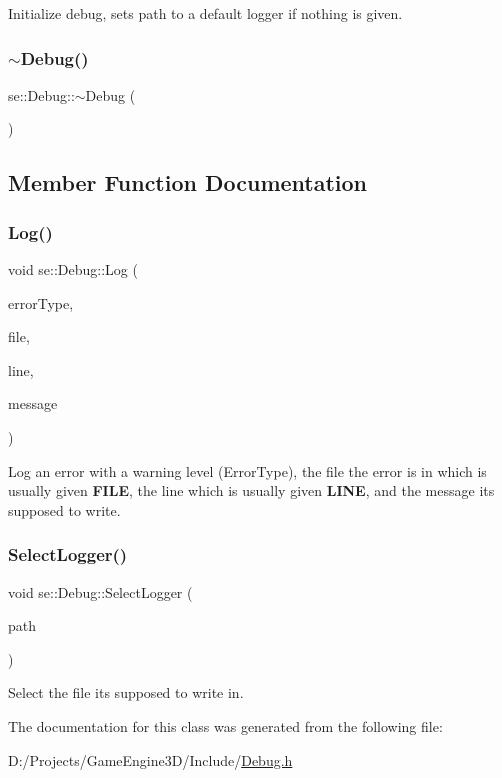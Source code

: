 Initialize debug, sets path to a default logger if nothing is given. \mbox{\label{classse_1_1_debug_a2ff6371c83b2a8918b15907bd1491ac9}} 
\subsubsection{\texorpdfstring{$\sim$\+Debug()}{~Debug()}}
{\footnotesize\ttfamily se\+::\+Debug\+::$\sim$\+Debug (\begin{DoxyParamCaption}{ }\end{DoxyParamCaption})}



\subsection{Member Function Documentation}
\mbox{\label{classse_1_1_debug_a3ebaea1144b70d56762d2b1054c8251d}} 
\subsubsection{\texorpdfstring{Log()}{Log()}}
{\footnotesize\ttfamily void se\+::\+Debug\+::\+Log (\begin{DoxyParamCaption}\item[{\mbox{\hyperlink{namespacese_aaa5cbe4d4821d8a349338e23de6ef9c4}{Error\+Type}}}]{error\+Type,  }\item[{const std\+::string \&}]{file,  }\item[{int}]{line,  }\item[{const std\+::string \&}]{message }\end{DoxyParamCaption})}

Log an error with a warning level (Error\+Type), the file the error is in which is usually given {\bfseries F\+I\+LE}, the line which is usually given {\bfseries L\+I\+NE}, and the message it\textquotesingle{}s supposed to write. \mbox{\label{classse_1_1_debug_ab97d44dca8606c2be2cb709f7e82be09}} 
\subsubsection{\texorpdfstring{Select\+Logger()}{SelectLogger()}}
{\footnotesize\ttfamily void se\+::\+Debug\+::\+Select\+Logger (\begin{DoxyParamCaption}\item[{const std\+::string \&}]{path }\end{DoxyParamCaption})}

Select the file it\textquotesingle{}s supposed to write in. 

The documentation for this class was generated from the following file\+:\begin{DoxyCompactItemize}
\item 
D\+:/\+Projects/\+Game\+Engine3\+D/\+Include/\mbox{\hyperlink{_debug_8h}{Debug.\+h}}\end{DoxyCompactItemize}

